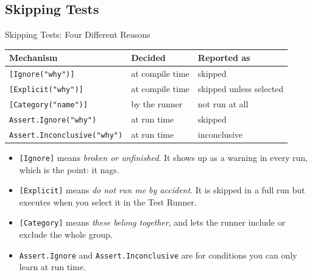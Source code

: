\subsection{Skipping Tests}

\begin{frame}{Skipping Tests: Four Different Reasons}
  \begin{center}
    \footnotesize
    \begin{tabular}{lll}
      \hline
      \textbf{Mechanism} & \textbf{Decided} & \textbf{Reported as}\\
      \hline
      \texttt{[Ignore("why")]}      & at compile time & skipped\\
      \texttt{[Explicit("why")]}    & at compile time & skipped unless selected\\
      \texttt{[Category("name")]}   & by the runner   & not run at all\\
      \texttt{Assert.Ignore("why")} & at run time     & skipped\\
      \texttt{Assert.Inconclusive("why")} & at run time & inconclusive\\
      \hline
    \end{tabular}
  \end{center}
  \vspace{2ex}

  \begin{itemize}
    \item \texttt{[Ignore]} means \emph{broken or unfinished}. It shows up as a
      warning in every run, which is the point: it nags.
    \item \texttt{[Explicit]} means \emph{do not run me by accident}. It is
      skipped in a full run but executes when you select it in the Test Runner.
    \item \texttt{[Category]} means \emph{these belong together}, and lets the
      runner include or exclude the whole group.
    \item \texttt{Assert.Ignore} and \texttt{Assert.Inconclusive} are for
      conditions you can only learn at run time.
  \end{itemize}
\end{frame}

